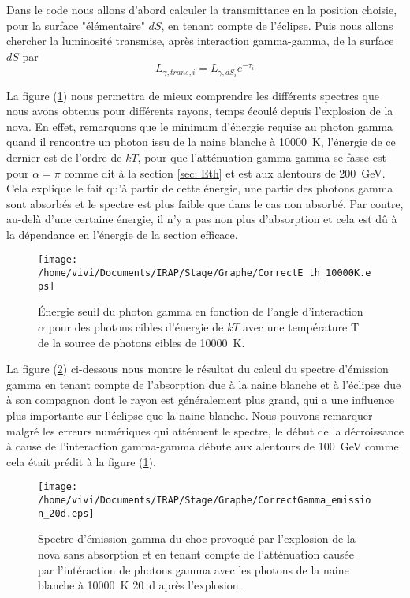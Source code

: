 \documentclass[a4paper,12pt,twoside]{article}
\begin{document}
Dans le code nous allons d'abord calculer la transmittance en la position choisie, pour la surface "élémentaire" $d S$, en tenant compte de l'éclipse. Puis nous allons chercher la luminosité transmise, après interaction gamma-gamma, de la surface $dS$ par
\begin{equation*}
	L_{\gamma, trans, i} = L_{\gamma, dS_i} e^{-\tau_i} 
\end{equation*}

La figure (\ref{fig: Eth 10000K}) nous permettra de mieux comprendre les différents spectres que nous avons obtenus pour différents rayons, temps écoulé depuis l'explosion de la nova. En effet, remarquons que le minimum d'énergie requise au photon gamma quand il rencontre un photon issu de la naine blanche à \SI{10000}{\K}, l'énergie de ce dernier est de l'ordre de $kT$, pour que l'atténuation gamma-gamma se fasse est pour $\alpha = \pi$ comme dit à la section \ref{sec: Eth} et est aux alentours de \SI{200}{\GeV}. Cela explique le fait qu'à partir de cette énergie, une partie des photons gamma sont absorbés et le spectre est plus faible que dans le cas non absorbé. Par contre, au-delà d'une certaine énergie, il n'y a pas non plus d'absorption et cela est dû à la dépendance en l'énergie de la section efficace.

\begin{figure}[H]
	\centering
    \texttt{[image: /home/vivi/Documents/IRAP/Stage/Graphe/CorrectE\_th\_10000K.eps]}
    \caption{Énergie seuil du photon gamma en fonction de l'angle d'interaction $\alpha$ pour des photons cibles d'énergie de $kT$ avec une température T de la source de photons cibles de \SI{10000}{\K}.}
    \label{fig: Eth 10000K}
\end{figure}

La figure (\ref{fig: gamma 20d}) ci-dessous nous montre le résultat du calcul du spectre d'émission gamma en tenant compte de l'absorption due à la naine blanche et à l'éclipse due à son compagnon dont le rayon est généralement plus grand, qui a une influence plus importante sur l'éclipse que la naine blanche. Nous pouvons remarquer malgré les erreurs numériques qui atténuent le spectre, le début de la décroissance à cause de l'interaction gamma-gamma débute aux alentours de \SI{100}{\GeV} comme cela était prédit à la figure (\ref{fig: Eth 10000K}).

\begin{figure}[H]
	\centering
    \texttt{[image: /home/vivi/Documents/IRAP/Stage/Graphe/CorrectGamma\_emission\_20d.eps]}
    \caption{Spectre d'émission gamma du choc provoqué par l'explosion de la nova sans absorption et en tenant compte de l'atténuation causée par l'intéraction de photons gamma avec les photons de la naine blanche à \SI{10000}{\K} \SI{20}{\day} après l'explosion.}
    \label{fig: gamma 20d}
\end{figure}
\end{document}
